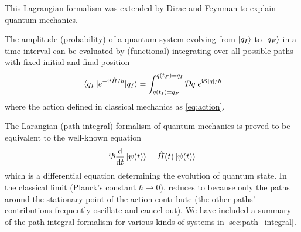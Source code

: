 This Lagrangian formalism was extended by Dirac \cite{diracAnalogyClassicalQuantum1945} and Feynman \cite{feynmanQuantumMechanicsPath2010} to explain quantum mechanics. 
\begin{axiom}\label{thm:path_integral}
    The amplitude (probability) of a quantum system evolving from $\ket{q_I}$ to $\ket{q_F}$ in a time interval can be evaluated by (functional) integrating over all possible paths with fixed initial and final position 
    \begin{equation}
		\mel{q_F}{e^{-\textup{i}t\hat{H}/\hbar}}{q_I} =
        \int_{q(t_I)= q_F}^{q(t_F)=q_I} \mathcal{D} q \; e^{\textup{i} \mathcal{S}[q]/\hbar}
    \end{equation}
	where the action defined in classical mechanics as \cref{eq:action}.
\end{axiom}
The Larangian (path integral) formalism of quantum mechanics is proved to be equivalent to the well-known \schrodinger equation \cite[Chp4]{feynmanQuantumMechanicsPath2010} 
\begin{equation}
    \textup{i}\hbar \dv{t} \ket{\psi(t)} = \hat{H}(t) \ket{\psi(t)}
    \label{eq:evolution}
\end{equation}
which is a differential equation determining the evolution of quantum state.
In the classical limit (Planck's constant $\hbar\to 0$),  reduces to 
because only the paths around the stationary point of the action contribute 
(the other paths' contributions frequently oscillate and cancel out).
We have included a summary of the path integral formalism for various kinds of systems in \cref{sec:path_integral}.